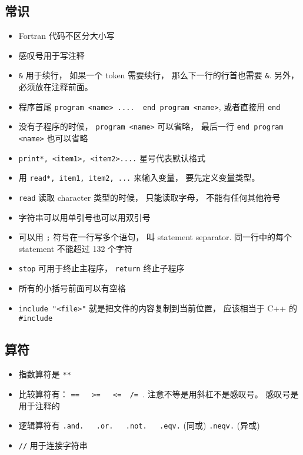 
\subsection{常识}
\begin{itemize}
\item Fortran 代码不区分大小写
\item 感叹号用于写注释
\item \verb`&` 用于续行， 如果一个 token 需要续行， 那么下一行的行首也需要 \verb`&`. 另外， 必须放在注释前面。
\item 程序首尾  \verb`program <name> ....  end program <name>`, 或者直接用 \verb`end`
\item 没有子程序的时候， \verb`program <name>` 可以省略， 最后一行 \verb`end program <name>` 也可以省略
\item \verb`print*, <item1>, <item2>....` 星号代表默认格式
\item 用 \verb`read*, item1, item2, ...` 来输入变量， 要先定义变量类型。 
\item \verb`read` 读取 character 类型的时候， 只能读取字母， 不能有任何其他符号
\item 字符串可以用单引号也可以用双引号
\item 可以用 \verb`;` 符号在一行写多个语句， 叫 statement separator. 同一行中的每个 statement 不能超过 132 个字符
\item \verb`stop` 可用于终止主程序， \verb`return` 终止子程序
\item 所有的小括号前面可以有空格
\item \verb`include "<file>"` 就是把文件的内容复制到当前位置， 应该相当于 C++ 的 \verb|#include|
\end{itemize}

\subsection{算符}
\begin{itemize}
\item 指数算符是 \verb`**`
\item 比较算符有： \verb`==   >=   <=  /= `.  注意不等是用斜杠不是感叹号。 感叹号是用于注释的
\item 逻辑算符有 \verb`.and.   .or.   .not.   .eqv.` (同或)  \verb`.neqv.` (异或)
\item \verb`//` 用于连接字符串
\end{itemize}

